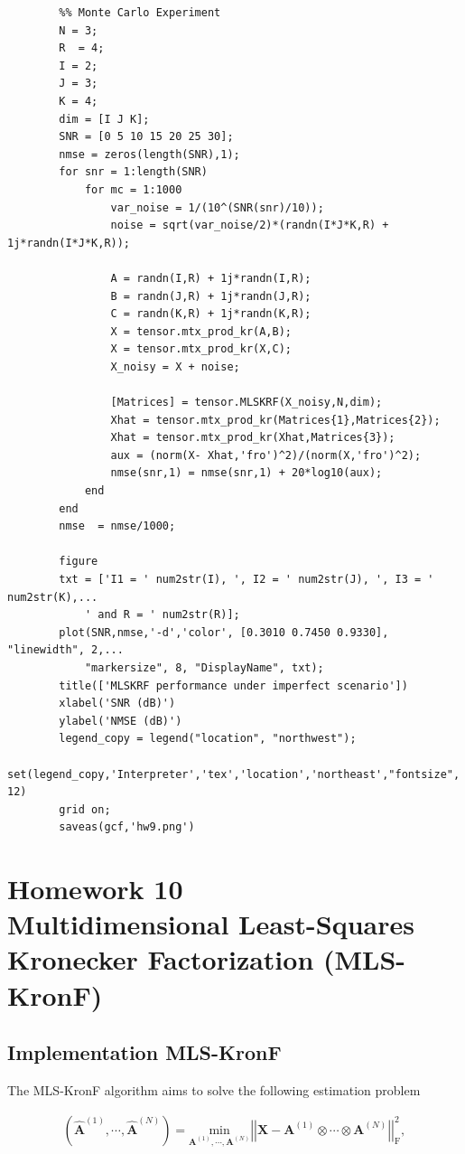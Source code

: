\documentclass[a4paper,10pt]{article}
\begin{document}
\begin{verbatim}
        %% Monte Carlo Experiment
        N = 3;
        R  = 4;
        I = 2;
        J = 3;
        K = 4;
        dim = [I J K];
        SNR = [0 5 10 15 20 25 30];
        nmse = zeros(length(SNR),1);
        for snr = 1:length(SNR)
            for mc = 1:1000
                var_noise = 1/(10^(SNR(snr)/10));
                noise = sqrt(var_noise/2)*(randn(I*J*K,R) + 1j*randn(I*J*K,R));
                
                A = randn(I,R) + 1j*randn(I,R);
                B = randn(J,R) + 1j*randn(J,R);
                C = randn(K,R) + 1j*randn(K,R);
                X = tensor.mtx_prod_kr(A,B);
                X = tensor.mtx_prod_kr(X,C);
                X_noisy = X + noise;
                
                [Matrices] = tensor.MLSKRF(X_noisy,N,dim);
                Xhat = tensor.mtx_prod_kr(Matrices{1},Matrices{2});
                Xhat = tensor.mtx_prod_kr(Xhat,Matrices{3});
                aux = (norm(X- Xhat,'fro')^2)/(norm(X,'fro')^2);
                nmse(snr,1) = nmse(snr,1) + 20*log10(aux);
            end
        end
        nmse  = nmse/1000;

        figure
        txt = ['I1 = ' num2str(I), ', I2 = ' num2str(J), ', I3 = ' num2str(K),...
            ' and R = ' num2str(R)];
        plot(SNR,nmse,'-d','color', [0.3010 0.7450 0.9330], "linewidth", 2,...
            "markersize", 8, "DisplayName", txt);
        title(['MLSKRF performance under imperfect scenario'])
        xlabel('SNR (dB)')
        ylabel('NMSE (dB)')
        legend_copy = legend("location", "northwest");
        set(legend_copy,'Interpreter','tex','location','northeast',"fontsize", 12)
        grid on;
        saveas(gcf,'hw9.png')
    \end{verbatim}
    
\newpage
\section*{Homework 10 \\ Multidimensional Least-Squares Kronecker Factorization
(MLS-KronF)}

    \subsection*{Implementation MLS-KronF}

    The MLS-KronF algorithm aims to solve the following estimation problem 

    \begin{align}
        \left(\hat{\boldsymbol{A}}^{(1)}, \cdots, \hat{\boldsymbol{A}}^{(N)}\right) = \underset{\boldsymbol{A}^{(1)}, \cdots, \boldsymbol{A}^{(N)}}{\text{min}} \left|\left| \boldsymbol{X} - \boldsymbol{A}^{(1)} \otimes \cdots \otimes \boldsymbol{A}^{(N)} \right|\right|^2_{\text{F}},
    \end{align}
\end{document}
